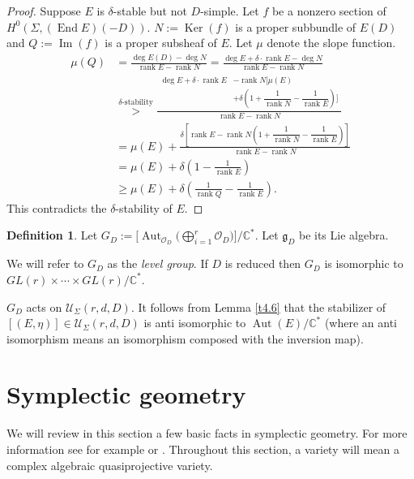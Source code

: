 \documentclass[12pt,a4paper,oneside,english]{smfart}
\theoremstyle{definition}
\newtheorem{defn}[thm]{Definition}
\theoremstyle{remark}
\DeclareMathOperator{\End}{End}
\DeclareMathOperator{\Aut}{Aut}
\DeclareMathOperator{\rank}{rank}
\DeclareMathOperator{\Ker}{Ker}
\DeclareMathOperator{\image}{Im}
\newcommand{\cU}{\mathcal{U}}
\newcommand{\cO}{\mathcal{O}}
\begin{document}
\begin{proof}
Suppose $E$ is $\delta$-stable but not $D$-simple. Let $f$ be a nonzero section of $H^0(\Sigma, (\End E)(-D))$. $N := \Ker(f)$ is a proper subbundle of $E(D)$ and $Q := \image(f)$ is a proper subsheaf of $E$. Let $\mu$ denote the slope function.
\begin{align*}
\mu(Q) &= \frac{\deg E(D) - \deg N}{\rank E - \rank N} = \frac{\deg E + \delta \cdot \rank E - \deg N}{\rank E - \rank N} \\[1ex]
&\overset{\delta\text{-stability}}{>}
\frac{\begin{aligned}\deg E + \delta \cdot \rank E {}&- \rank N\biggl[\mu(E) \\[-1mm]
&+ \delta \left(1 + \dfrac{1}{\rank N} - \dfrac{1}{\rank E}\right)\biggr]\end{aligned}}{\rank E - \rank N} \\[1ex]
&= \mu(E) + \frac{\delta \left[ \rank E - \rank N \left( 1 + \dfrac{1}{\rank N} - \dfrac{1}{\rank E} \right) \right]}{\rank E - \rank N} \\[1ex]
&= \mu(E) + \delta \left( 1 - \frac{1}{\rank E} \right) \\
&\geqslant \mu(E) + \delta \left( \frac{1}{\rank Q} - \frac{1}{\rank E} \right).
\end{align*}
This contradicts the $\delta$-stability of $E$.
\end{proof}

\begin{defn}\label{t4.7}
Let $G_D := \bigl[\Aut_{\cO_D}\bigl(\bigoplus_{i=1}^{r} \cO_D\bigr)\bigr] / \mathbb{C}^*$. Let $\mathfrak{g}_D$ be its Lie algebra.
\end{defn}

We will refer to $G_D$ as the \emph{level group}. If $D$ is reduced then $G_D$ is isomorphic to $GL(r) \times \cdots \times GL(r)/\mathbb{C}^*$.

$G_D$ acts on $\cU_\Sigma(r, d, D)$. It follows from Lemma \ref{t4.6} that the stabilizer of $[(E, \eta)] \in \cU_\Sigma(r, d, D)$ is anti isomorphic to $\Aut(E)/\mathbb{C}^*$ (where an anti isomorphism means an isomorphism composed with the inversion map).

\section{Symplectic geometry}\label{sec:5}

We will review in this section a few basic facts in symplectic geometry. For more information see for example \cite{A-G} or \cite{W}. Throughout this section, a variety will mean a complex algebraic quasiprojective variety.
\end{document}
